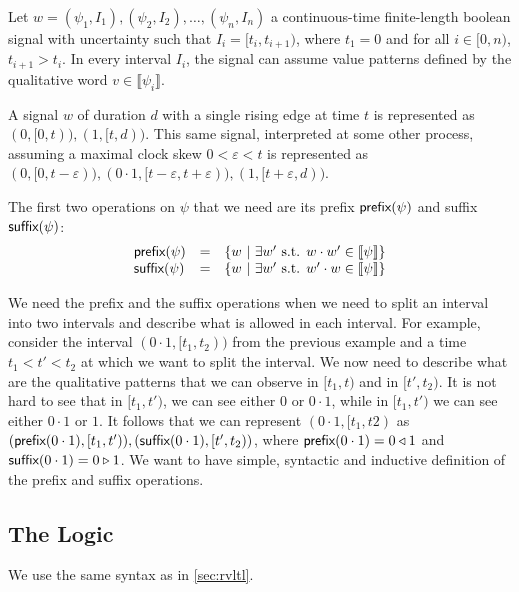 Let $w = (\psi_1, I_1), (\psi_2, I_2), \ldots , (\psi_n, I_n)$ a continuous-time finite-length boolean signal with uncertainty such that $I_i = [t_i, t_{i+1})$, where $t_1 = 0$ and for all $i \in [0,n)$, $t_{i+1} > t_i$.
In every interval $I_i$, the signal can assume value patterns defined by the qualitative word $v \in \llbracket \psi_i \rrbracket$.

\begin{example}
	A signal $w$ of duration $d$ with a single rising edge at time $t$ is represented as $(0, [0, t)), (1, [t, d))$.
	This same signal, interpreted at some other process, assuming a maximal clock skew $0 < \varepsilon < t$ is represented as $(0, [0, t - \varepsilon)), (0\cdot 1, [t - \varepsilon, t + \varepsilon)), (1, [t + \varepsilon, d))$. %
\end{example}

The first two operations on $\psi$ that we need are its prefix $\textsf{prefix}(\psi)$ and suffix $\textsf{suffix}(\psi)$:
\begin{equation}
	\begin{array}{lcl}
		\textsf{prefix}(\psi) & = & \{ w~|~ \exists w' \text{ s.t. } w\cdot w' \in \llbracket \psi \rrbracket \} \\
		\textsf{suffix}(\psi) & = & \{ w~|~ \exists w' \text{ s.t. } w'\cdot w \in \llbracket \psi \rrbracket \} \\
	\end{array}
\end{equation}

\begin{example}
	We need the prefix and the suffix operations when we need to split an interval into two intervals and describe what is allowed in each interval. For example, consider the interval $(0\cdot 1, [t_1, t_2))$ from the previous example and a time $t_1 < t' < t_2$ at which we want to split the interval. We now need to describe what are the qualitative patterns that we can observe in $[t_1, t)$ and in $[t', t_2)$. It is not hard to see that in $[t_1, t')$, we can see either $0$ or $0 \cdot 1$, while in $[t_1, t')$ we can see either $0 \cdot 1$ or $1$. It follows that we can represent $(0 \cdot 1, [t_1, t2)$ as $(\textsf{prefix}(0\cdot 1), [t_1, t')), (\textsf{suffix}(0 \cdot 1), [t', t_2))$, where $\textsf{prefix}(0 \cdot 1) = 0 \triangleleft 1$ and $\textsf{suffix}(0 \cdot 1) = 0 \triangleright 1$. We want to have simple, syntactic and inductive definition of the prefix and suffix operations.
\end{example}


\subsection{The Logic}
We use the same syntax as in \cref{sec:rvltl}.

